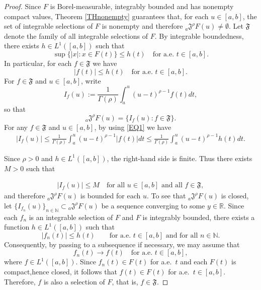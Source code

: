 \documentclass[10pt,a4paper]{amsart}
\begin{document}
\begin{proof}
Since $F$ is Borel-measurable, integrably bounded and has nonempty compact values, Theorem \ref{THnonempty} guarantees that, for each $u\in[a,b]$, the set of
integrable selections of $F$ is nonempty and therefore
${}_{a}\mathfrak{J}^{\rho}F(u)\neq\emptyset$.
Let $\mathfrak{F}$ denote the family of all integrable selections of $F$. By integrable boundedness, there exists $h\in L^{1}([a,b])$ such that
$$\sup\{|x|:x\in F(t)\}\le h(t)
\quad\text{for a.e. }t\in[a,b].$$
In particular, for each $f\in\mathfrak{F}$ we have
\begin{equation}\label{EQ1}
|f(t)|\le h(t)\quad\text{for a.e. }t\in[a,b].
\end{equation}
For $f\in\mathfrak{F}$ and $u\in[a,b]$, write
$$I_f(u):=\frac{1}{\Gamma(\rho)}\int_{a}^{u}(u-t)^{\rho-1}f(t)dt,$$
so that
$${}_{a}\mathfrak{J}^{\rho}F(u)=\{I_f(u):f\in\mathfrak{F}\}.$$
For any $f\in\mathfrak{F}$ and $u\in[a,b]$, by using \eqref{EQ1} we have
\begin{align*}
    |I_f(u)|
\le
\frac{1}{\Gamma(\rho)}\int_{a}^{u}(u-t)^{\rho-1}|f(t)|dt
\le
\frac{1}{\Gamma(\rho)}\int_{a}^{u}(u-t)^{\rho-1}h(t)dt.
\end{align*}

Since $\rho>0$ and
$h\in L^{1}([a,b])$, the right-hand side is finite. 
Thus there exists $M>0$ such that

\begin{align*}
    |I_f(u)|\le M
\quad\text{for all }u\in[a,b]\text{ and all }f\in\mathfrak{F},
\end{align*}
and therefore ${}_{a}\mathfrak{J}^{\rho}F(u)$ is bounded for each $u$. To see that ${}_{a}\mathfrak{J}^{\rho}F(u)$ is closed, let  $\{I_{f_n}(u)\}_{n\in\mathbb{N}}\subset {}_{a}\mathfrak{J}^{\rho}F(u)$  be a sequence converging to some $y\in\mathbb{R}$.   Since each $f_n$ is an integrable selection of $F$ and $F$ is integrably
bounded, there exists a function $h\in L^{1}([a,b])$ such that
\begin{equation}\label{EQ2}
|f_n(t)|\le h(t)
\qquad\text{for a.e. }t\in[a,b]\text{ and for all }n\in\mathbb{N}.
\end{equation}
Consequently, by passing to a subsequence if necessary, we may assume that
\[
f_n(t)\longrightarrow f(t)
\quad\text{for a.e. }t\in[a,b],
\]
where $f\in L^{1}([a,b])$. Since $f_n(t)\in F(t)$ for a.e.~$t$ and each
$F(t)$ is compact,hence closed, it follows that $f(t)\in F(t)$ for a.e.~$t\in[a,b]$. Therefore, $f$ is also a selection of $F$, that is,
$f\in\mathfrak{F}$.


\end{proof}
\end{document}
